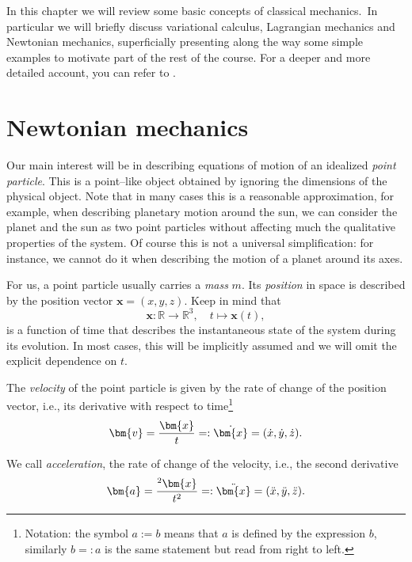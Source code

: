 \documentclass[english,fontsize=11pt,paper=a5,oneside]{scrbook}
\newcommand{\R}{\mathbb{R}}
\newcommand{\bx}{\bm{x}}
\newcommand{\bv}{\bm{v}}
\let\d\relax
\newcommand{\d}{\mathrm{d}}
\newcommand{\der}[2]{\frac{\d{#1}}{\d{#2}}}
\theoremstyle{definition}
\begin{document}
In this chapter we will review some basic concepts of classical mechanics.\
In particular we will briefly discuss variational calculus, Lagrangian mechanics and Newtonian mechanics, superficially presenting along the way some simple examples to motivate part of the rest of the course.
For a deeper and more detailed account, you can refer to \cite{book:arnold,book:knauf}.

\section{Newtonian mechanics}

Our main interest will be in describing equations of motion of an idealized \emph{point particle}.
This is a point--like object obtained by ignoring the dimensions of the physical object. Note that in many cases this is a reasonable approximation, for example, when describing planetary motion around the sun, we can consider the planet and the sun as two point particles without affecting much the qualitative properties of the system.
Of course this is not a universal simplification: for instance, we cannot do it when describing the motion of a planet around its axes.

For us, a point particle usually carries a \emph{mass} $m$.
Its \emph{position} in space is described by the position vector $\bx = (x, y ,z)$.
Keep in mind that
\begin{equation}
\bx : \R\to\R^3,\quad t \mapsto \bx(t),
\end{equation}
is a function of time that describes the instantaneous state of the system during its evolution.
In most cases, this will be implicitly assumed and we will omit the explicit dependence on $t$.

The \emph{velocity} of the point particle is given by the rate of change of the position vector,
i.e., its derivative with respect to time\footnote{Notation: the symbol $a := b$ means that $a$ is defined by the expression $b$, similarly $b =: a$ is the same statement but read from right to left.} 
\begin{equation}
  \bv = \der{\bx}{t} =: \dot{\bx} = (\dot{x}, \dot{y}, \dot{z}).
\end{equation}

We call \emph{acceleration}, the rate of change of the velocity, i.e., the second derivative
\begin{equation}
  \bm{a} = \der{^2\bx}{t^2} =: \ddot{\bx} = (\ddot{x}, \ddot{y}, \ddot{z}).
\end{equation}
\end{document}
